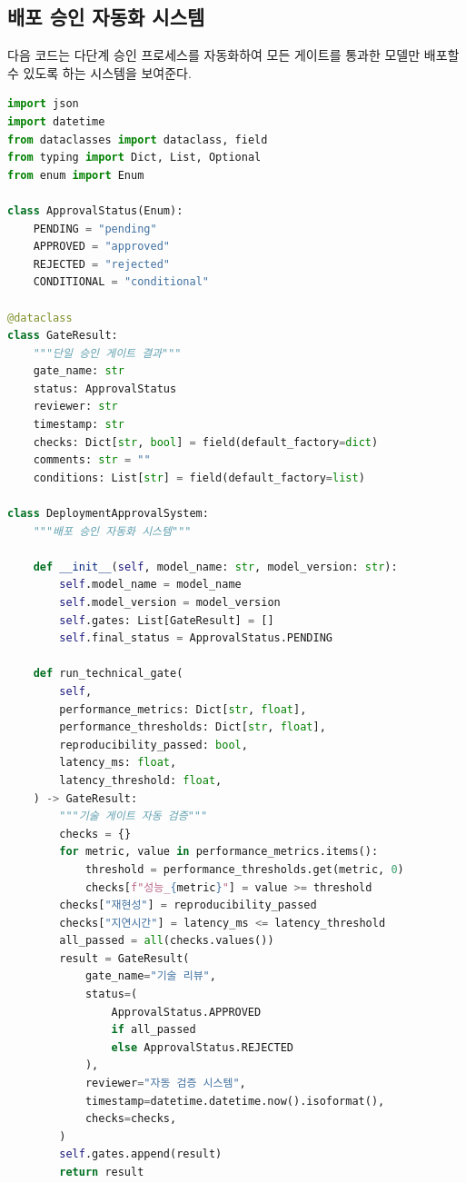 \subsection{배포 승인 자동화 시스템}
\label{sec:10.6.5}

다음 코드는 다단계 승인 프로세스를 자동화하여 모든 게이트를 통과한 모델만 배포할 수 있도록 하는 시스템을 보여준다.

\begin{lstlisting}[language=Python, caption={배포 승인 자동화 시스템}, label={lst:deployment_approval}]
import json
import datetime
from dataclasses import dataclass, field
from typing import Dict, List, Optional
from enum import Enum

class ApprovalStatus(Enum):
    PENDING = "pending"
    APPROVED = "approved"
    REJECTED = "rejected"
    CONDITIONAL = "conditional"

@dataclass
class GateResult:
    """단일 승인 게이트 결과"""
    gate_name: str
    status: ApprovalStatus
    reviewer: str
    timestamp: str
    checks: Dict[str, bool] = field(default_factory=dict)
    comments: str = ""
    conditions: List[str] = field(default_factory=list)

class DeploymentApprovalSystem:
    """배포 승인 자동화 시스템"""

    def __init__(self, model_name: str, model_version: str):
        self.model_name = model_name
        self.model_version = model_version
        self.gates: List[GateResult] = []
        self.final_status = ApprovalStatus.PENDING

    def run_technical_gate(
        self,
        performance_metrics: Dict[str, float],
        performance_thresholds: Dict[str, float],
        reproducibility_passed: bool,
        latency_ms: float,
        latency_threshold: float,
    ) -> GateResult:
        """기술 게이트 자동 검증"""
        checks = {}
        for metric, value in performance_metrics.items():
            threshold = performance_thresholds.get(metric, 0)
            checks[f"성능_{metric}"] = value >= threshold
        checks["재현성"] = reproducibility_passed
        checks["지연시간"] = latency_ms <= latency_threshold
        all_passed = all(checks.values())
        result = GateResult(
            gate_name="기술 리뷰",
            status=(
                ApprovalStatus.APPROVED
                if all_passed
                else ApprovalStatus.REJECTED
            ),
            reviewer="자동 검증 시스템",
            timestamp=datetime.datetime.now().isoformat(),
            checks=checks,
        )
        self.gates.append(result)
        return result


\end{lstlisting}
